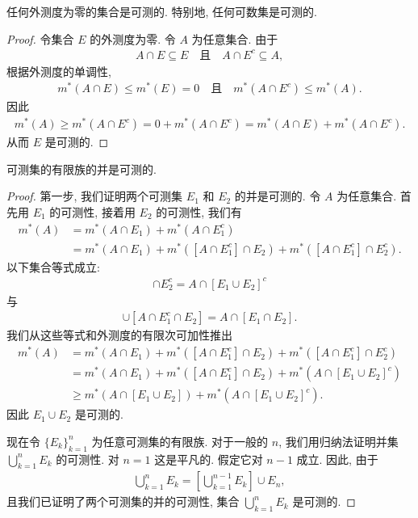 \documentclass[../../main.tex]{subfiles}
\begin{document}
\begin{proposition}\label{proposition:ch02-零外测度可测}
任何外测度为零的集合是可测的. 特别地, 任何可数集是可测的.
\end{proposition}

\begin{proof}
令集合 $E$ 的外测度为零. 令 $A$ 为任意集合. 由于
\begin{align*}
A\cap E\subseteq E\quad\text{且}\quad A\cap E^{c}\subseteq A,
\end{align*}
根据外测度的单调性,
\begin{align*}
m^{*}(A\cap E)\leqslant m^{*}(E)=0\quad\text{且}\quad m^{*}(A\cap E^{c})\leqslant m^{*}(A).
\end{align*}
因此
\begin{align*}
m^{*}(A)\geqslant m^{*}(A\cap E^{c})=0+m^{*}(A\cap E^{c})=m^{*}(A\cap E)+m^{*}(A\cap E^{c}).
\end{align*}
从而 $E$ 是可测的.
\end{proof}

\begin{proposition}\label{proposition:ch02-有限并可测}
可测集的有限族的并是可测的.
\end{proposition}

\begin{proof}
第一步, 我们证明两个可测集 $E_{1}$ 和 $E_{2}$ 的并是可测的. 令 $A$ 为任意集合. 首先用 $E_{1}$ 的可测性, 接着用 $E_{2}$ 的可测性, 我们有
\begin{align*}
m^{*}(A)&=m^{*}(A\cap E_{1})+m^{*}(A\cap E_{1}^{c})\\
&=m^{*}(A\cap E_{1})+m^{*}([A\cap E_{1}^{c}]\cap E_{2})+m^{*}([A\cap E_{1}^{c}]\cap E_{2}^{c}).
\end{align*}
以下集合等式成立:
\begin{align*}
[A\cap E_{1}^{c}]\cap E_{2}^{c}=A\cap[E_{1}\cup E_{2}]^{c}
\end{align*}
与
\begin{align*}
[A\cap E_{1}]\cup[A\cap E_{1}^{c}\cap E_{2}]=A\cap[E_{1}\cap E_{2}].
\end{align*}
我们从这些等式和外测度的有限次可加性推出
\begin{align*}
m^{*}(A)&=m^{*}(A\cap E_{1})+m^{*}([A\cap E_{1}^{c}]\cap E_{2})+m^{*}([A\cap E_{1}^{c}]\cap E_{2}^{c})\\
&=m^{*}(A\cap E_{1})+m^{*}([A\cap E_{1}^{c}]\cap E_{2})+m^{*}(A\cap[E_{1}\cup E_{2}]^{c})\\
&\geqslant m^{*}(A\cap[E_{1}\cup E_{2}])+m^{*}(A\cap[E_{1}\cup E_{2}]^{c}).
\end{align*}
因此 $E_{1}\cup E_{2}$ 是可测的.

现在令 $\{E_{k}\}_{k=1}^{n}$ 为任意可测集的有限族. 对于一般的 $n$, 我们用归纳法证明并集 $\bigcup_{k=1}^{n}E_{k}$ 的可测性. 对 $n=1$ 这是平凡的. 假定它对 $n-1$ 成立. 因此, 由于
\begin{align*}
\bigcup_{k=1}^{n}E_{k}=\left[\bigcup_{k=1}^{n-1}E_{k}\right]\cup E_{n},
\end{align*}
且我们已证明了两个可测集的并的可测性, 集合 $\bigcup_{k=1}^{n}E_{k}$ 是可测的.
\end{proof}
\end{document}
